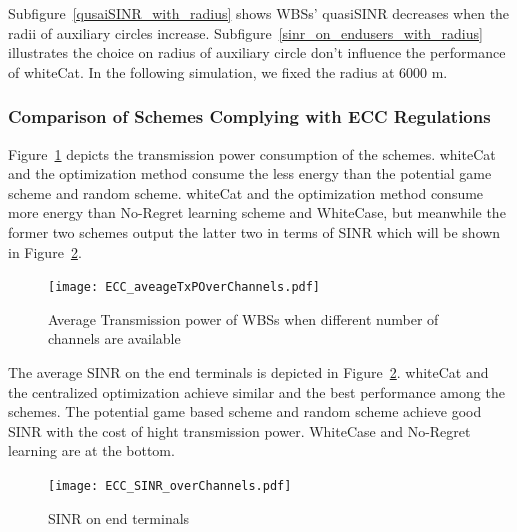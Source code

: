 \documentclass[times]{ettauth}
\theoremstyle{mytheoremstyle}
\theoremstyle{mytheoremstyle}
\theoremstyle{mytheoremstyle}
\begin{document}
Subfigure~\ref{qusaiSINR_with_radius} shows WBSs' quasiSINR decreases when the radii of auxiliary circles increase.
Subfigure~\ref{sinr_on_endusers_with_radius} illustrates the choice on radius of auxiliary circle don't influence the performance of whiteCat.
In the following simulation, we fixed the radius at 6000 m.

\subsubsection{Comparison of Schemes Complying with ECC Regulations}
 
Figure~\ref{transPower} depicts the transmission power consumption of the schemes.
whiteCat and the optimization method consume the less energy than the potential game scheme and random scheme.
whiteCat and the optimization method consume more energy than No-Regret learning scheme and WhiteCase, but meanwhile the former two schemes output the latter two in terms of SINR which will be shown in Figure~\ref{6000_sinr}.

 \begin{figure}[h!]
    \centering
      \texttt{[image: ECC\_aveageTxPOverChannels.pdf]}
    \caption{Average Transmission power of WBSs when different number of channels are available}
\label{transPower}    
  \end{figure}
  

     
The average SINR on the end terminals is depicted in Figure~\ref{6000_sinr}.
whiteCat and the centralized optimization achieve similar and the best performance among the schemes.
The potential game based scheme and random scheme achieve good SINR with the cost of hight transmission power.
WhiteCase and No-Regret learning are at the bottom.
     \begin{figure}[h!]
       \centering
       \texttt{[image: ECC\_SINR\_overChannels.pdf]}
       \caption{SINR on end terminals}
	\label{6000_sinr}
     \end{figure}
\end{document}
